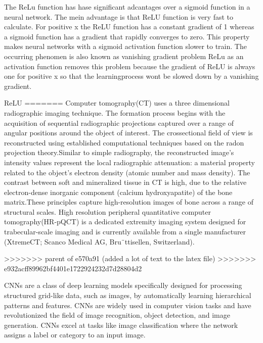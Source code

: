 \documentclass[
a4paper, 
12pt,
grayscalebody, %
abstract=on,
twoside, BCOR10mm, 12pt, DIV13,headinclude, footexclude, final, abstracton, openright
]{ibireprt}
\numberwithin{equation}{chapter}
\numberwithin{table}{chapter}
\numberwithin{figure}{chapter}
\numberwithin{algorithm}{chapter}
\numberwithin{example}{chapter}
\numberwithin{example}{chapter}
\begin{document}
The ReLu function has hase significant adcantages over a sigmoid function in a neural network. The mein advantage is that ReLU function is very fast to calculate. For positive x the ReLU function has a constant gradient of 1 whereas a sigmoid function has a gradient that rapidly converges to zero. This property makes neural networks with a sigmoid activation function slower to train. The occurring phenomen is also known as vanishing gradient problem %
ReLu as an activation function removes this problem because the gradient of ReLU is always one for positive x so that the learningprocess wont be slowed down by a vanishing gradient. 

 

ReLU
=======
Computer tomography(CT) uses a three dimensional radiographic imaging technique. The formation process begins with the acquisition of sequential radiographic projections captured over a range of angular positions around the object of interest. The crossectional field of view is reconstructed using established computational techniques based on the radon projection theory\cite{article}.Similar to simple radiography, the reconstructed image’s intensity values represent the local radiographic attenuation: a material property related to the object’s electron density (atomic number and mass density). The contrast between soft and mineralized tissue in CT is high, due to the relative electron-dense inorganic component (calcium hydroxyapatite) of the bone matrix.These principles capture high-resolution images of bone
across a range of structural scales. %
High resolution peripheral quantitative computer tomography(HR-pQCT) is a  dedicated extremity imaging system designed for trabecular-scale imaging and is currently available from a single manufacturer (XtremeCT; Scanco Medical AG,
Bru¨ttisellen, Switzerland). 

>>>>>>> parent of e570a91 (added a lot of text to the latex file)
>>>>>>> e932acff89962bf4401e1722924232d7d28804d2

CNNs are a class of deep learning models specifically designed for processing structured grid-like data, such as images, by automatically learning hierarchical patterns and features. CNNs are widely used in computer vision tasks and have revolutionized the field of image recognition, object detection, and image generation. CNNs excel at tasks like image classification where the network assigns a label or category to an input image.
\end{document}
